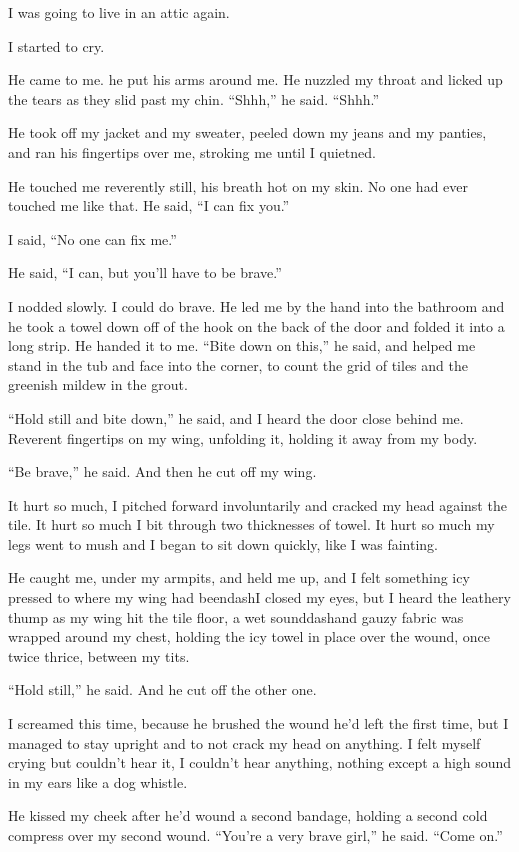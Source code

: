 I was going to live in an attic again.

I started to cry.

He came to me.  he put his arms around me.  He nuzzled my throat and
licked up the tears as they slid past my chin.  ``Shhh,'' he said. 
``Shhh.''

He took off my jacket and my sweater, peeled down my jeans and my
panties, and ran his fingertips over me, stroking me until I quietned.

He touched me reverently still, his breath hot on my skin.  No one had
ever touched me like that.  He said, ``I can fix you.''

I said, ``No one can fix me.''

He said, ``I can, but you'll have to be brave.''

I nodded slowly.  I could do brave.  He led me by the hand into the
bathroom and he took a towel down off of the hook on the back of the
door and folded it into a long strip.  He handed it to me.  ``Bite
down on this,'' he said, and helped me stand in the tub and face into
the corner, to count the grid of tiles and the greenish mildew in the
grout.

``Hold still and bite down,'' he said, and I heard the door close
behind me.  Reverent fingertips on my wing, unfolding it, holding it
away from my body.

``Be brave,'' he said.  And then he cut off my wing.

It hurt so much, I pitched forward involuntarily and cracked my head
against the tile.  It hurt so much I bit through two thicknesses of
towel.  It hurt so much my legs went to mush and I began to sit down
quickly, like I was fainting.

He caught me, under my armpits, and held me up, and I felt something
icy pressed to where my wing had beendash{}I closed my eyes, but I heard
the leathery thump as my wing hit the tile floor, a wet sounddash{}and
gauzy fabric was wrapped around my chest, holding the icy towel in
place over the wound, once twice thrice, between my tits.

``Hold still,'' he said.  And he cut off the other one.

I screamed this time, because he brushed the wound he'd left the first
time, but I managed to stay upright and to not crack my head on
anything.  I felt myself crying but couldn't hear it, I couldn't hear
anything, nothing except a high sound in my ears like a dog whistle.

He kissed my cheek after he'd wound a second bandage, holding a second
cold compress over my second wound.  ``You're a very brave girl,'' he
said.  ``Come on.''

